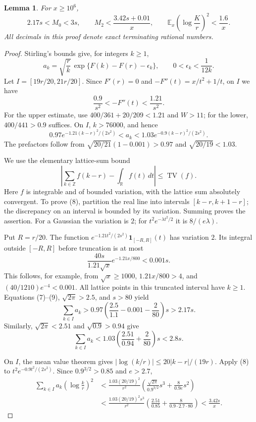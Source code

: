 \documentclass[10pt]{article}
\newtheorem{lemma}[theorem]{Lemma}
\newcommand{\E}{\mathbb E}
\begin{document}
\begin{lemma}\label{moments}
For $x\ge10^6$,
\[
 2.17s<M_0<3s,\qquad
 M_2<\frac{3.42s+0.01}{x},\qquad
 \E_x\left(\log\frac Kr\right)^2<\frac{1.6}{x}.          \tag{4}
\]
All decimals in this proof denote exact terminating rational numbers.
\end{lemma}

\begin{proof}
Stirling's bounds \cite{Robbins} give, for integers $k\ge1$,
\[
 a_k=\sqrt{\frac rk}\,
       \exp\{F(k)-F(r)-\epsilon_k\},
 \qquad 0<\epsilon_k<\frac1{12k}.                       \tag{5}
\]
Let $I=[19r/20,21r/20]$. Since
$F'(r)=0$ and $-F''(t)=x/t^2+1/t$, on $I$ we have
\[
 \frac{0.9}{s^2}<-F''(t)<\frac{1.21}{s^2}.             \tag{6}
\]
For the upper estimate, use
$400/361+20/209<1.21$ and $W>11$; for the lower,
$400/441>0.9$ suffices.
On $I$, $k>76000$, and hence
\[
 0.97e^{-1.21(k-r)^2/(2s^2)}
 <a_k<
 1.03e^{-0.9(k-r)^2/(2s^2)}.                           \tag{7}
\]
The prefactors follow from
$\sqrt{20/21}(1-0.001)>0.97$ and $\sqrt{20/19}<1.03$.

We use the elementary lattice-sum bound
\[
 \left|\sum_{k\in\mathbb Z}f(k-r)-\int_{\mathbb R}f(t)\,dt\right|
 \le \operatorname{TV}(f).                            \tag{8}
\]
Here $f$ is integrable and of bounded variation, with the lattice sum
absolutely convergent. To prove (8), partition the real line into
intervals $[k-r,k+1-r]$; the discrepancy on an interval is bounded
by its variation. Summing proves the assertion. For a Gaussian the
variation is $2$; for $t^2e^{-\lambda t^2/2}$ it is $8/(e\lambda)$.

Put $R=r/20$. The function
$e^{-1.21t^2/(2s^2)}\mathbf1_{[-R,R]}(t)$ has variation $2$.
Its integral outside $[-R,R]$ before truncation is at most
\[
 \frac{40s}{1.21\sqrt{x}}e^{-1.21x/800}<0.001s.         \tag{9}
\]
This follows, for example, from $\sqrt{x}\ge1000$,
$1.21x/800>4$, and $(40/1210)e^{-4}<0.001$.
All lattice points in this truncated interval have $k\ge1$.
Equations (7)--(9), $\sqrt{2\pi}>2.5$, and $s>80$ yield
\[
 \sum_{k\in I}a_k
 >0.97\left(\frac{2.5}{1.1}-0.001-\frac2{80}\right)s
 >2.17s.                                             \tag{10}
\]
Similarly, $\sqrt{2\pi}<2.51$ and $\sqrt{0.9}>0.94$ give
\[
 \sum_{k\in I}a_k
 <1.03\left(\frac{2.51}{0.94}+\frac2{80}\right)s
 <2.8s.                                              \tag{11}
\]

On $I$, the mean value theorem gives
$|\log(k/r)|\le20|k-r|/(19r)$. Apply (8) to
$t^2e^{-0.9t^2/(2s^2)}$. Since $0.9^{3/2}>0.85$ and $e>2.7$,
\begin{align*}
 \sum_{k\in I}a_k\left(\log\frac kr\right)^2
 &<\frac{1.03(20/19)^2}{r^2}
       \left(\frac{\sqrt{2\pi}}{0.9^{3/2}}s^3+
                          \frac8{0.9e}s^2\right)\\
 &<\frac{1.03(20/19)^2s^3}{r^2}
       \left(\frac{2.51}{0.85}+
                          \frac8{0.9\cdot2.7\cdot80}\right)
 <\frac{3.42s}{x}.                                    \tag{12}
\end{align*}


\end{proof}
\end{document}

